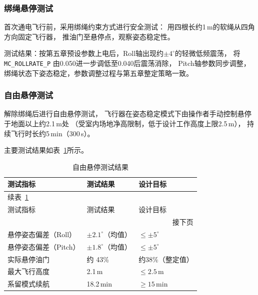 \subsubsection{绑绳悬停测试}

首次通电飞行前，采用绑绳约束方式进行安全测试：
用四根长约1\,m的软绳从四角方向固定飞行器，
推油门至悬停点，观察姿态稳定性。

测试结果：按第五章预设参数上电后，Roll轴出现约$\pm4^\circ$的轻微低频震荡，
将 \texttt{MC\_ROLLRATE\_P} 由0.050进一步调低至0.040后震荡消除，
Pitch轴参数同步调整，绑绳状态下姿态稳定，参数调整过程与第五章整定策略一致。

\subsubsection{自由悬停测试}

解除绑绳后进行自由悬停测试，
飞行器在姿态稳定模式下由操作者手动控制悬停于地面以上约2.1\,m处
（受室内场地净高限制，低于设计工作高度上限2.5\,m），
持续飞行时长约5\,min（300\,s）。

主要测试结果如表~\ref{tab:hover_result}所示。

\begin{longtable}{p{4.5cm} p{3.5cm} p{3.5cm}}
    \caption{自由悬停测试结果}
    \label{tab:hover_result} \\

    \toprule
    测试指标 & 测试结果 & 设计目标 \\
    \midrule
    \endfirsthead

    \multicolumn{3}{l}{\small 续表~\ref*{tab:hover_result}} \\[2pt]
    \toprule
    测试指标 & 测试结果 & 设计目标 \\
    \midrule
    \endhead

    \midrule
    \multicolumn{3}{r}{\small 接下页} \\
    \endfoot

    \bottomrule
    \endlastfoot

    悬停姿态偏差（Roll）  & $\pm 2.1^\circ$（均值）  & $\leq \pm5^\circ$ \\[3pt]
    悬停姿态偏差（Pitch） & $\pm 1.8^\circ$（均值）  & $\leq \pm5^\circ$ \\[3pt]
    实际悬停油门  & 约 43\%  & 约38\%（整定值） \\[3pt]
    最大飞行高度          & 2.1\,m                   & $\leq 2.5$\,m \\[3pt]
    系留模式续航          & 18.2\,min                & $\geq 15$\,min \\

\end{longtable}

